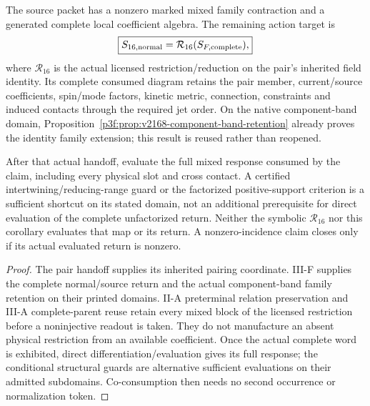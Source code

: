 \documentclass[12pt,a4paper]{article}
\begin{document}
\begin{corollary}
\label{p5c:cor:v2167-cpbl2-handoff-frontier}
The source packet has a nonzero marked mixed family contraction and a
generated complete local coefficient algebra. The remaining action target is
\[
 \boxed{S_{16,\rm normal}=\mathcal R_{16}(S_{F,\rm complete}),}
\]
where $\mathcal R_{16}$ is the actual licensed restriction/reduction on the
pair's inherited field identity. Its complete consumed diagram retains the
pair member, current/source coefficients, spin/mode factors, kinetic metric,
connection, constraints and induced contacts through the required jet order.
On the native component-band domain,
Proposition~\ref{p3f:prop:v2168-component-band-retention} already proves the
identity family extension; this result is reused rather than reopened.

After that actual handoff, evaluate the full mixed response consumed by the
claim, including every physical slot and cross contact. A certified
intertwining/reducing-range guard or the factorized positive-support
criterion is a sufficient shortcut on its stated domain, not an additional
prerequisite for direct evaluation of the complete unfactorized return.
Neither the symbolic $\mathcal R_{16}$ nor this corollary evaluates that map
or its return. A nonzero-incidence claim closes only if its actual evaluated
return is nonzero.
\end{corollary}
\begin{proof}
The pair handoff supplies its inherited pairing coordinate. III-F supplies
the complete normal/source return and the actual component-band family
retention on their printed domains. II-A preterminal relation preservation
and III-A complete-parent reuse retain every mixed block of the licensed
restriction before a noninjective readout is taken. They do not manufacture
an absent physical restriction from an available coefficient. Once the
actual complete word is exhibited, direct differentiation/evaluation gives
its full response; the conditional structural guards are alternative
sufficient evaluations on their admitted subdomains. Co-consumption then
needs no second occurrence or normalization token.
\end{proof}
\end{document}
